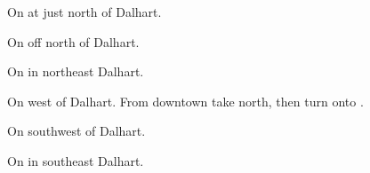 
\begin{LocationList}

On  at  just north of Dalhart.

On  off  north of Dalhart.

On  in northeast Dalhart.

On  west of Dalhart.
From downtown take  north, then turn onto .

On  southwest of Dalhart.

\Location{\TruckStop \Gas \Rest \Service}
On  in southeast Dalhart.

\end{LocationList}
